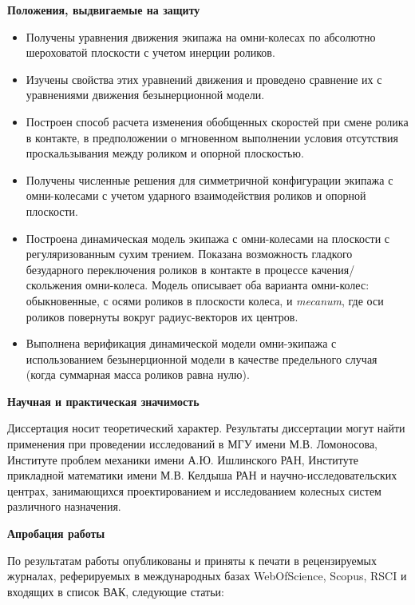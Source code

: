 \textbf{Положения, выдвигаемые  на защиту}

\begin{itemize}

	\item Получены уравнения движения экипажа на омни-колесах по абсолютно шероховатой плоскости с учетом инерции роликов.

	\item Изучены свойства этих уравнений движения и проведено сравнение их с уравнениями движения безынерционной модели.

	\item Построен способ расчета изменения обобщенных скоростей при смене ролика в контакте, в предположении о мгновенном выполнении условия отсутствия проскальзывания между роликом и опорной плоскостью.

	\item Получены численные решения для симметричной конфигурации экипажа с омни-колесами с учетом ударного взаимодействия роликов и опорной плоскости.

	\item Построена динамическая модель экипажа с омни-колесами на плоскости с регуляризованным сухим трением. Показана возможность гладкого безударного переключения роликов в контакте в процессе качения/скольжения омни-колеса. Модель описывает оба варианта омни-колес: обыкновенные, с осями роликов в плоскости колеса, и \textit{mecanum}, где оси роликов повернуты вокруг радиус-векторов их центров.

	\item Выполнена верификация динамической модели омни-экипажа с использованием безынерционной модели в качестве предельного случая (когда суммарная масса роликов равна нулю).
\end{itemize}

\textbf{Научная и практическая значимость}

Диссертация носит теоретический характер. Результаты диссертации могут найти применения при проведении исследований в МГУ имени М.В. Ломоносова, Институте проблем механики имени А.Ю. Ишлинского РАН, Институте прикладной математики имени М.В. Келдыша РАН и научно-иссле\-до\-ва\-тель\-ских центрах, занимающихся проектированием и исследованием колесных систем различного назначения.

\textbf{Апробация работы}

По результатам работы опубликованы и приняты к печати в рецензируемых журналах, реферируемых в международных базах WebOfScience, Scopus, RSCI и входящих в список ВАК, следующие статьи: 

